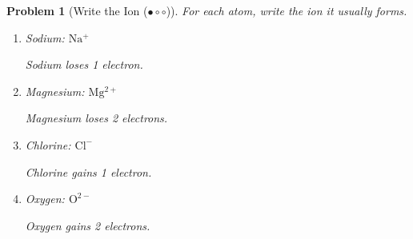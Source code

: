 \documentclass[a4paper,11pt]{article}
\newcommand{\easy}{(\ensuremath{\bullet \circ \circ})}
\theoremstyle{listprobstyle}
\newtheorem{problem}{Problem}
\newenvironment{solution}
    {\par\begingroup\color{BrickRed}}
    {\par\endgroup}
\begin{document}
\begin{problem}[Write the Ion \easy]
For each atom, write the ion it usually forms.
\vspace{-0.6\baselineskip}
\begin{enumerate}[label=\alph*),itemsep=0pt,parsep=0pt,topsep=0pt]
\item Sodium: \underline{
        \textcolor{BrickRed}{\phantom{X}$\mathrm{Na^+}$\phantom{X}}
    }
    \begin{solution}
    Sodium loses 1 electron.
    \end{solution}
\vspace{0.5\baselineskip}
\item Magnesium: \underline{
        \textcolor{BrickRed}{\phantom{X}$\mathrm{Mg^{2+}}\phantom{X}$}
    }
    \begin{solution}
    Magnesium loses 2 electrons.
    \end{solution}
\vspace{0.5\baselineskip}
\item Chlorine: \underline{
        \textcolor{BrickRed}{\phantom{X}$\mathrm{Cl^-}$\phantom{X}}
    }
    \begin{solution}
    Chlorine gains 1 electron.
    \end{solution}
\vspace{0.5\baselineskip}
\item Oxygen: \underline{
        \textcolor{BrickRed}{\phantom{X}$\mathrm{O^{2-}}\phantom{X}$}
    }
    \begin{solution}
    Oxygen gains 2 electrons.
    \end{solution}
\end{enumerate}
\end{problem}
\end{document}
